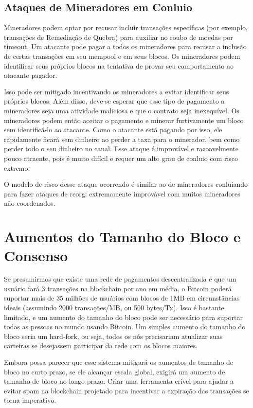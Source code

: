 \documentclass[letterpaper,11pt]{article}
\begin{document}
\subsection{Ataques de Mineradores em Conluio}

Mineradores podem optar por recusar incluir transações específicas (por
exemplo, transações de Remediação de Quebra) para auxiliar no roubo de
moedas por timeout. Um atacante pode pagar a todos os mineradores para
recusar a inclusão de certas transações em seu mempool e em seus blocos. Os
mineradores podem identificar seus próprios blocos na tentativa de provar
seu comportamento ao atacante pagador.

Isso pode ser mitigado incentivando os mineradores a evitar identificar
seus próprios blocos. Além disso, deve-se esperar que esse tipo de
pagamento a mineradores seja uma atividade maliciosa e que o contrato seja
inexequível. Os mineradores podem então aceitar o pagamento e minerar
furtivamente um bloco sem identificá-lo ao atacante. Como o atacante está
pagando por isso, ele rapidamente ficará sem dinheiro ao perder a taxa
para o minerador, bem como perder todo o seu dinheiro no canal. Esse
ataque é improvável e razoavelmente pouco atraente, pois é muito difícil e
requer um alto grau de conluio com risco extremo.

O modelo de risco desse ataque ocorrendo é similar ao de mineradores
conluiando para fazer ataques de reorg: extremamente improvável com muitos
mineradores não coordenados.

\section{Aumentos do Tamanho do Bloco e Consenso}

Se presumirmos que existe uma rede de pagamentos descentralizada e que um
usuário fará 3 transações na blockchain por ano em média, o Bitcoin poderá
suportar mais de 35 milhões de usuários com blocos de 1MB em circunstâncias
ideais (assumindo 2000 transações/MB, ou 500 bytes/Tx). Isso é bastante
limitado, e um aumento do tamanho do bloco pode ser necessário para
suportar todas as pessoas no mundo usando Bitcoin. Um simples aumento do
tamanho do bloco seria um hard-fork, ou seja, todos os nós precisariam
atualizar suas carteiras se desejassem participar da rede com os blocos
maiores.

Embora possa parecer que esse sistema mitigará os aumentos de tamanho de
bloco no curto prazo, se ele alcançar escala global, exigirá um aumento de
tamanho de bloco no longo prazo. Criar uma ferramenta crível para ajudar a
evitar spam na blockchain projetado para incentivar a expiração das
transações se torna imperativo.
\end{document}
